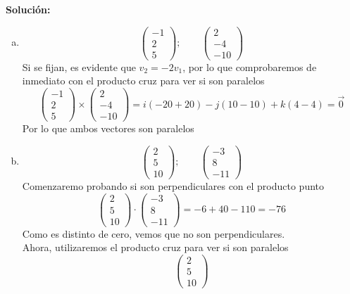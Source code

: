 \documentclass[12pt]{article}
\newenvironment{solucion}
{\begin{mdframed}[backgroundcolor=black!10]
		{\bf Solución:}\\
	}
	{
	\end{mdframed}
}
\newenvironment{preguntas}
{\begin{enumerate}\itemsep12pt
	}
	{
	\end{enumerate}
}
\begin{document}
\begin{preguntas}
\begin{solucion}
\begin{enumerate}[a)]
\item $$ 
			\begin{pmatrix}
			-1\\
			2\\
			5
			\end{pmatrix};\qquad
			\begin{pmatrix}
			2\\
			-4\\
			-10
			\end{pmatrix}$$
			Si se fijan, es evidente que $v_2 = -2v_1$, por lo que comprobaremos de inmediato con el producto cruz para ver si son paralelos
			 $$ 
			\begin{pmatrix}
			-1\\
			2\\
			5
			\end{pmatrix} \times 
			\begin{pmatrix}
			2\\
			-4\\
			-10
			\end{pmatrix} = i (-20 + 20) -j (10 - 10) + k (4 - 4) = \vec{0}$$
			Por lo que ambos vectores son paralelos
\item $$ 
			\begin{pmatrix}
			2\\
			5\\
			10
			\end{pmatrix};\qquad
			\begin{pmatrix}
			-3\\
			8\\
			-11
			\end{pmatrix}$$
			Comenzaremo probando si son perpendiculares con el producto punto
			$$ 
			\begin{pmatrix}
			2\\
			5\\
			10
			\end{pmatrix} \cdot
			\begin{pmatrix}
			-3\\
			8\\
			-11
			\end{pmatrix} = -6 + 40 - 110 = -76$$
			Como es distinto de cero, vemos que no son perpendiculares.\\
			Ahora, utilizaremos el producto cruz para ver si son paralelos
			$$ 
			\begin{pmatrix}
			2\\
			5\\
			10

\end{pmatrix}$$
\end{enumerate}
\end{solucion}
\end{preguntas}
\end{document}
